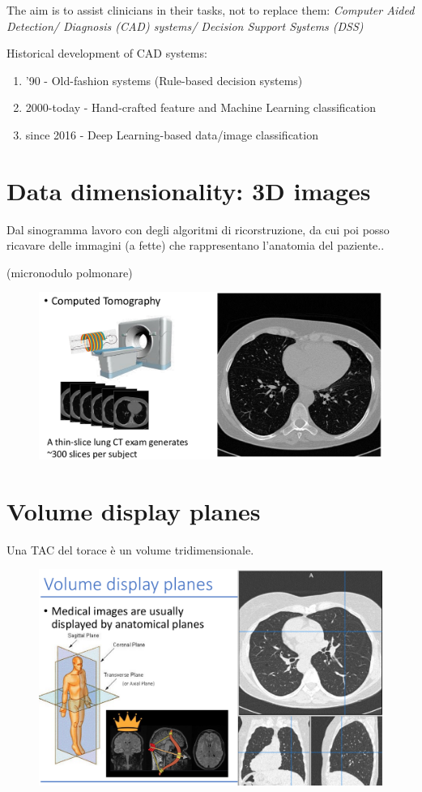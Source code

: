 The aim is to assist clinicians in their tasks,
not to replace them: \textit{Computer Aided Detection/ Diagnosis (CAD) systems/ Decision Support Systems (DSS)}

Historical development of CAD systems:
\begin{enumerate}
	\item ’90 - Old-fashion systems (Rule-based decision systems)
	\item 2000-today - Hand-crafted feature and Machine Learning classification
	\item since 2016 - Deep Learning-based data/image classification
\end{enumerate}


\section{Data dimensionality: 3D images}

Dal sinogramma lavoro con degli algoritmi di ricorstruzione, da cui poi posso ricavare delle immagini (a fette) che rappresentano l'anatomia del paziente..

(micronodulo polmonare)\\


\begin{figure}[ht]
	\centering
	\includegraphics[width=0.7\linewidth]{figure_med/datadim3d}
\end{figure}
\FloatBarrier

\section{Volume display planes}
Una TAC del torace è un volume tridimensionale.\\


\begin{figure}[ht]
	\centering
	\includegraphics[width=0.8\linewidth]{figure_med/vdp}
\end{figure}
\FloatBarrier

